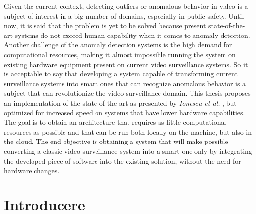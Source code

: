 \documentclass[a4paper,12pt]{report}
\renewenvironment{abstract}[1]
  {\bigskip\selectlanguage{#1}%
   \begin{center}\bfseries\abstractname\end{center}}
  {\par\bigskip}
\begin{document}
\begin{abstract}{english}\par Given the current context, detecting outliers or anomalous behavior in video is a subject of interest in a big number of domains, especially in public safety. Until now, it is said that the problem is yet to be solved because present state-of-the-art systems do not exceed human capability when it comes to anomaly detection. Another challenge of the anomaly detection systems is the high demand for computational resources, making it almost impossible running the system on existing hardware equipment present on current video surveillance systems. So it is acceptable to say that developing a system capable of transforming current surveillance systems into smart ones that can recognize anomalous behavior is a subject that can revolutionize the video surveillance domain. This thesis proposes an implementation of the state-of-the-art as presented by  \emph{Ionescu et al.} \cite{ionescu2019object}, but optimized for increased speed on systems that have lower hardware capabilities. The goal is to obtain an architecture that requires as little computational resources as possible and that can be run both locally on the machine, but also in the cloud. The end objective is obtaining a system that will make possible converting a classic video surveillance system into a smart one only by integrating the developed piece of software into the existing solution, without the need for hardware changes. 
\end{abstract}
\tableofcontents
{}
\setcounter{page}{2}
\chapter{Introducere}
\end{document}
